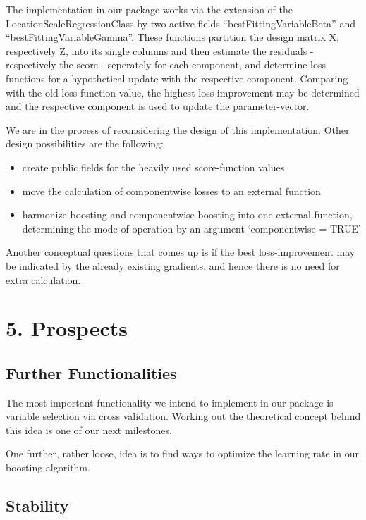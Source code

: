 \documentclass[
]{report}
\providecommand{\tightlist}{%
  \setlength{\itemsep}{0pt}\setlength{\parskip}{0pt}}
\begin{document}
The implementation in our package works via the extension of the
LocationScaleRegressionClass by two active fields
``bestFittingVariableBeta'' and ``bestFittingVariableGamma''. These
functions partition the design matrix X, respectively Z, into its single
columns and then estimate the residuals - respectively the score -
seperately for each component, and determine loss functions for a
hypothetical update with the respective component. Comparing with the
old loss function value, the highest loss-improvement may be determined
and the respective component is used to update the parameter-vector.

We are in the process of reconsidering the design of this
implementation. Other design possibilities are the following:

\begin{itemize}
\tightlist
\item
  create public fields for the heavily used score-function values
\item
  move the calculation of componentwise losses to an external function
\item
  harmonize boosting and componentwise boosting into one external
  function, determining the mode of operation by an argument
  `componentwise = TRUE'
\end{itemize}

Another conceptual questions that comes up is if the best
loss-improvement may be indicated by the already existing gradients, and
hence there is no need for extra calculation.

\hypertarget{prospects}{%
\chapter{5. Prospects}\label{prospects}}

\hypertarget{further-functionalities}{%
\section{Further Functionalities}\label{further-functionalities}}

The most important functionality we intend to implement in our package
is variable selection via cross validation. Working out the theoretical
concept behind this idea is one of our next milestones.

One further, rather loose, idea is to find ways to optimize the learning
rate in our boosting algorithm.

\hypertarget{stability}{%
\section{Stability}\label{stability}}
\end{document}
